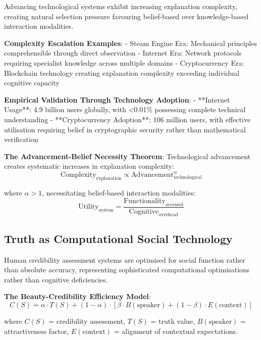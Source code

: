 \documentclass[12pt,a4paper]{article}
\begin{document}
Advancing technological systems exhibit increasing explanation complexity, creating natural selection pressure favouring belief-based over knowledge-based interaction modalities.

\textbf{Complexity Escalation Examples}:
- Steam Engine Era: Mechanical principles comprehensible through direct observation
- Internet Era: Network protocols requiring specialist knowledge across multiple domains  
- Cryptocurrency Era: Blockchain technology creating explanation complexity exceeding individual cognitive capacity

\textbf{Empirical Validation Through Technology Adoption}:
- **Internet Usage**: 4.9 billion users globally, with <0.01\% possessing complete technical understanding
- **Cryptocurrency Adoption**: 106 million users, with effective utilisation requiring belief in cryptographic security rather than mathematical verification

\textbf{The Advancement-Belief Necessity Theorem}: Technological advancement creates systematic increases in explanation complexity:
\begin{equation}
\text{Complexity}_{\text{explanation}} \propto \text{Advancement}_{\text{technological}}^{\alpha}
\end{equation}

where $\alpha > 1$, necessitating belief-based interaction modalities:
\begin{equation}
\text{Utility}_{\text{system}} = \frac{\text{Functionality}_{\text{accessed}}}{\text{Cognitive}_{\text{overhead}}}
\end{equation}

\subsection{Truth as Computational Social Technology}

Human credibility assessment systems are optimised for social function rather than absolute accuracy, representing sophisticated computational optimisations rather than cognitive deficiencies.

\textbf{The Beauty-Credibility Efficiency Model}:
\begin{equation}
C(S) = \alpha \cdot T(S) + (1-\alpha) \cdot [\beta \cdot B(\text{speaker}) + (1-\beta) \cdot E(\text{context})]
\end{equation}

where $C(S)$ = credibility assessment, $T(S)$ = truth value, $B(\text{speaker})$ = attractiveness factor, $E(\text{context})$ = alignment of contextual expectations.
\end{document}
